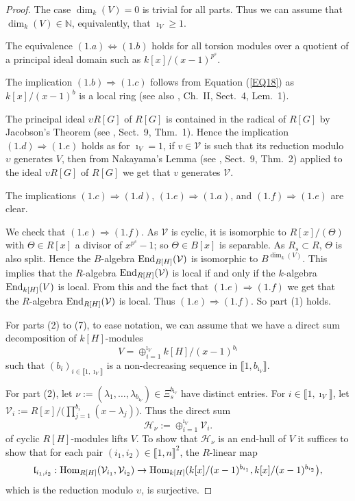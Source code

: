 \documentclass[11pt]{amsart}
\def\End{\textup{End}}
\def\Hom{\textup{Hom}}
\begin{document}
\begin{proof}
The case $\dim_k(V)=0$ is trivial for all parts. Thus we can assume that $\dim_k(V)\in\mathbb N$, equivalently, that $\imath_V\ge 1$.

The equivalence $(1.a)\Leftrightarrow (1.b)$ holds for all torsion modules over a quotient of a principal ideal domain such as $k[x]/(x-1)^{p^s}$. 

The implication $(1.b)\Rightarrow (1.c)$ follows from Equation (\ref{EQ18}) as $k[x]/(x-1)^b$ is a local ring (see also \cite{A}, Ch.\ II, Sect.\ 4, Lem.\ 1). 

The principal ideal $\upsilon R[G]$ of $R[G]$ is contained in the radical of $R[G]$ by Jacobson's Theorem (see \cite{Bo}, Sect.\ 9, Thm.\ 1). Hence the implication  $(1.d)\Rightarrow (1.e)$ holds as for $\imath_V=1$, if $v\in\mathcal V$ is such that its reduction modulo $\upsilon$ generates $V$, then from Nakayama's Lemma (see \cite{Bo}, Sect.\ 9, Thm.\ 2) applied to the ideal $\upsilon R[G]$ of $R[G]$ we get that $v$ generates $\mathcal V$.

The implications $(1.c)\Rightarrow (1.d)$, $(1.e)\Rightarrow (1.a)$, and $(1.f)\Rightarrow (1.e)$ are clear. 

We check that $(1.e)\Rightarrow (1.f)$. As $\mathcal V$ is cyclic, it is isomorphic to $R[x]/(\Theta)$ with $\Theta\in R[x]$ a divisor of $x^{p^s}-1$; so $\Theta\in B[x]$ is separable. As $R_s\subset R$, $\Theta$ is also split. Hence the $B$-algebra $\End_{B[H]}(\mathcal V)$ is isomorphic to $B^{\dim_k(V)}$. This implies that the $R$-algebra $\End_{R[H]}(\mathcal V)$ is local if and only if the $k$-algebra $\End_{k[H]}(V)$ is local. From this and the fact that $(1.e)\Rightarrow (1.f)$ we get that the $R$-algebra $\End_{R[H]}(\mathcal V)$ is local. Thus $(1.e)\Rightarrow (1.f)$. So part (1) holds. 

For parts (2) to (7), to ease notation, we can assume that we have a direct sum decomposition of $k[H]$-modules
$$V=\oplus_{i=1}^{\imath_V} k[H]/(x-1)^{b_i}$$
such that $(b_i)_{i\in\llbracket1,\imath_V\rrbracket}$ is a non-decreasing sequence in $\llbracket1,b_{\imath_V}\rrbracket$.

For part (2), let $\nu:=(\lambda_1,\ldots,\lambda_{b_{\imath_V}})\in\Xi_s^{b_{\imath_V}}$ have distinct entries. For $i\in\llbracket1,\imath_V\rrbracket$, let $\mathcal V_i:=R[x]/\bigl(\prod_{j=1}^{b_i} (x-\lambda_j)\bigr)$. Thus the direct sum
$$\mathcal H_{\nu}:=\oplus_{i=1}^{\imath_V} \mathcal V_i.$$
of cyclic $R[H]$-modules lifts $V$. To show that $\mathcal H_{\nu}$ is an end-hull of $V$ it suffices to show that for each pair $(i_1,i_2)\in\llbracket1,n\rrbracket^2$, the $R$-linear map 
$$\mathfrak l_{i_1,i_2}:\Hom_{R[H]}(\mathcal V_{i_1},\mathcal V_{i_2})\rightarrow \Hom_{k[H]}(k[x]/(x-1)^{b_{i_1}},k[x]/(x-1)^{b_{i_2}}\bigr),$$
which is the reduction modulo $\upsilon$, is surjective. 


\end{proof}
\end{document}
